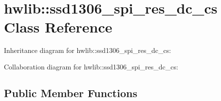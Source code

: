 \hypertarget{classhwlib_1_1ssd1306__spi__res__dc__cs}{}\section{hwlib\+:\+:ssd1306\+\_\+spi\+\_\+res\+\_\+dc\+\_\+cs Class Reference}
\label{classhwlib_1_1ssd1306__spi__res__dc__cs}


Inheritance diagram for hwlib\+:\+:ssd1306\+\_\+spi\+\_\+res\+\_\+dc\+\_\+cs\+:


Collaboration diagram for hwlib\+:\+:ssd1306\+\_\+spi\+\_\+res\+\_\+dc\+\_\+cs\+:
\subsection*{Public Member Functions}

